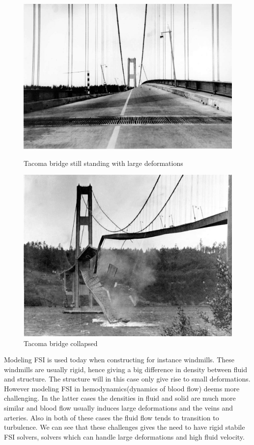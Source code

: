 \begin{figure}
\centering
\begin{minipage}{.51\textwidth}
  \centering
  \includegraphics[width=.95\linewidth]{./IntroductionToFSI/tacoma2.jpeg}
  \caption{Tacoma bridge still standing with large deformations}
  \label{fig:test1}
\end{minipage}%
\begin{minipage}{.50\textwidth}
  \centering
  \includegraphics[width=.95\linewidth]{./IntroductionToFSI/tacoma3.jpeg}
  \caption{Tacoma bridge collapsed}
  \label{fig:test2}
\end{minipage}
\end{figure}

Modeling FSI is used today when constructing for instance windmills. These windmills are usually rigid, hence giving a big difference in density between fluid and structure. The structure will in this case only give rise to small deformations. However modeling FSI in hemodynamics(dynamics of blood flow) deems more challenging. In the latter cases the densities in fluid and solid are much more similar and blood flow usually induces large deformations and the veins and arteries. Also in both of these cases the fluid flow tends to transition to turbulence. We can see that these challenges gives the need to have rigid stabile FSI solvers, solvers which can handle large deformations and high fluid velocity. \newline

